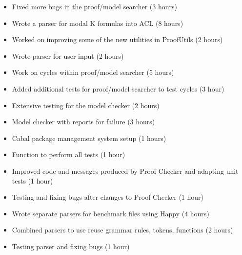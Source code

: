 %
{ \begin{itemize} 
 \item Fixed more bugs in the proof/model searcher (3 hours)
 \item Wrote a parser for modal K formulas into ACL (8 hours)
 \item Worked on improving some of the new utilities in ProofUtils (2 hours)
 \item Wrote parser for user input (2 hours)
 \end{itemize} 
}%
{ \begin{itemize} 
 \item Work on cycles within proof/model searcher (5 hours)
 \item Added additional tests for proof/model searcher to test cycles (3 hour)
 \end{itemize} 
}%
{ \begin{itemize} 
 \item Extensive testing for the model checker (2 hours)
 \item Model checker with reports for failure (3 hours)
 \item Cabal package management system setup (1 hours)
 \item Function to perform all tests (1 hour)
 \end{itemize} 
}%
{ \begin{itemize} 
 \item Improved code and messages produced by Proof Checker and adapting unit tests (1 hour)
 \item Testing and fixing bugs after changes to Proof Checker (1 hour)
 \item Wrote separate parsers for benchmark files using Happy (4 hours)
 \item Combined parsers to use reuse grammar rules, tokens, functions (2 hours)
 \item Testing parser and fixing bugs (1 hour)
 \end{itemize} 
}%

